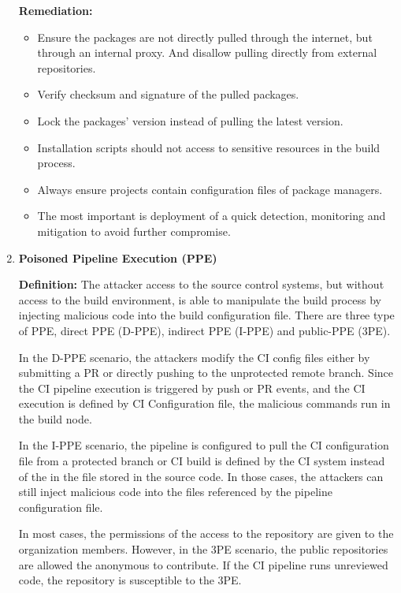 \begin{enumerate}[label=(\arabic*)]
    \textbf{Remediation:}
        \begin{itemize}
            \item Ensure the packages are not directly pulled through the internet, 
            but through an internal proxy. And disallow pulling directly from external repositories.
            \item Verify checksum and signature of the pulled packages.
            \item Lock the packages' version instead of pulling the latest version.
            \item Installation scripts should not access to 
            sensitive resources in the build process.
            \item Always ensure projects contain configuration files of package managers.
            \item The most important is deployment of a quick detection, 
            monitoring and mitigation to avoid further compromise.
        \end{itemize}
    \item \textbf{Poisoned Pipeline Execution (PPE)}

    \textbf{Definition: }
        The attacker access to the source control systems, but without access to the build environment, is
        able to manipulate the build process by injecting malicious code into the build configuration file.
        There are three type of PPE, direct PPE (D-PPE), indirect PPE (I-PPE) and public-PPE (3PE).

        In the D-PPE scenario, the attackers modify the CI config files either by submitting a PR or directly pushing to the unprotected
        remote branch. Since the CI pipeline execution is triggered by push or PR events, and the CI execution
        is defined by CI Configuration file, the malicious commands run in the build node.

        In the I-PPE scenario, the pipeline is configured to pull the CI configuration file from a protected 
        branch or CI build is defined by the CI system instead of the in the file stored in the source code.
        In those cases, the attackers can still inject malicious code into the files referenced by the pipeline
        configuration file.

        In most cases, the permissions of the access to the repository are given to the organization
        members. However, in the 3PE scenario, the public repositories are allowed the anonymous to 
        contribute. If the CI pipeline runs unreviewed code, the repository is susceptible to the 3PE.


\end{enumerate}
